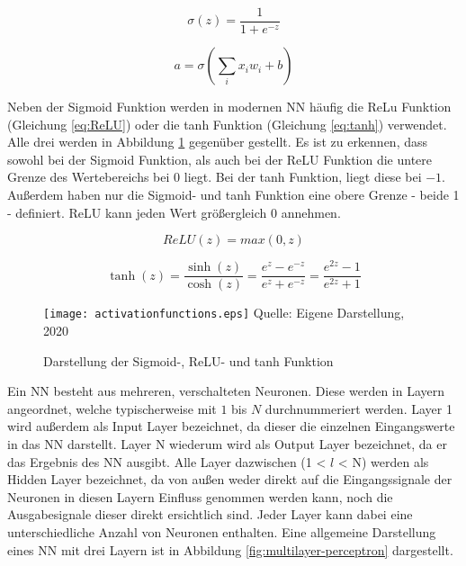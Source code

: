 \begin{equation} \label{eq:sigmoid}
    \sigma (z) =  \frac{1}{1+e^{-z}}
\end{equation}

\begin{equation} \label{eq:outputNeuron}
    a = \sigma (\sum_{i}{x_i w_i + b})
\end{equation}

Neben der Sigmoid Funktion werden in modernen \ac{NN} häufig die ReLu Funktion (Gleichung \ref{eq:ReLU}) oder die tanh Funktion (Gleichung \ref{eq:tanh}) verwendet. Alle drei werden in Abbildung \ref{fig:activationfunctions} gegenüber gestellt. Es ist zu erkennen, dass sowohl bei der Sigmoid Funktion, als auch bei der ReLU Funktion die untere Grenze des Wertebereichs bei $0$ liegt. Bei der tanh Funktion, liegt diese bei $-1$. Außerdem haben nur die Sigmoid- und tanh Funktion eine obere Grenze - beide 1 - definiert. ReLU kann jeden Wert größergleich $0$ annehmen.

\begin{equation} \label{eq:ReLU}
    ReLU(z) = max(0,z)
\end{equation}

\begin{equation} \label{eq:tanh}
    \tanh(z) = \frac{\sinh(z)}{\cosh(z)} = \frac {e^z - e^{-z}} {e^z + e^{-z}}
  = \frac{e^{2z} - 1} {e^{2z} + 1}
\end{equation}

\begin{figure}[H]
    \centering
    \caption[]{Darstellung der Sigmoid-, ReLU- und tanh Funktion}
	\label{fig:activationfunctions}
    \texttt{[image: activationfunctions.eps]}
    Quelle: Eigene Darstellung, 2020
\end{figure}

Ein \ac{NN} besteht aus mehreren, verschalteten Neuronen. Diese werden in Layern angeordnet, welche typischerweise mit $1$ bis $N$ durchnummeriert werden. Layer 1 wird außerdem als Input Layer bezeichnet, da dieser die einzelnen Eingangswerte in das \ac{NN} darstellt. Layer N wiederum wird als Output Layer bezeichnet, da er das Ergebnis des \ac{NN} ausgibt. Alle Layer dazwischen (1 < $l$ < N) werden als Hidden Layer bezeichnet, da von außen weder direkt auf die Eingangssignale der Neuronen in diesen Layern Einfluss genommen werden kann, noch die Ausgabesignale dieser direkt ersichtlich sind. Jeder Layer kann dabei eine unterschiedliche Anzahl von Neuronen enthalten. Eine allgemeine Darstellung eines \ac{NN} mit drei Layern ist in Abbildung \ref{fig:multilayer-perceptron} dargestellt.

